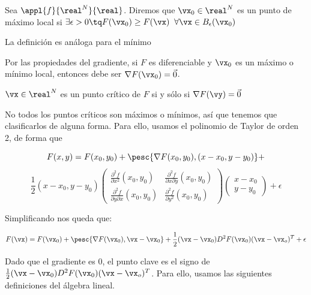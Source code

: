 \documentclass[nochap]{apuntes}
\begin{document}
\begin{defn} Sea $\appl{f}{\real^N}{\real}$. Diremos que $\vx_0 \in \real^N$ es un punto de máximo local si $\exists \epsilon > 0 \tq F(\vx_0) \geq F(\vx)\;\; \forall \vx \in B_{\epsilon} (\vx_0) $

La definición es análoga para el mínimo\end{defn}

\begin{remark} Por las propiedades del gradiente, si $F$ es diferenciable y $\vx_0$ es un máximo o mínimo local, entonces debe ser $\nabla F(\vx_0) = \vec{0}$.\end{remark}

\begin{defn} $\vx \in \real^N$ es un punto crítico de $F$ si y sólo si $\nabla F(\vy) = \vec{0}$\end{defn}

No todos los puntos críticos son máximos o mínimos, así que tenemos que clasificarlos de alguna forma. Para ello, usamos el polinomio de Taylor de orden 2, de forma que 

\[
F(x,y) = F(x_0, y_0) + \pesc{\nabla F(x_0, y_0), (x-x_0, y-y_0)} +\]\[\frac{1}{2}(x-x_0, y-y_0)\left(\begin{matrix} \frac{\partial^2 f}{∂ x^2} (x_0,y_0) & \frac{\partial^2 f}{\partial x \partial y} (x_0,y_0) 
\\ \frac{\partial^2 f}{\partial y \partial x} (x_0,y_0) & \frac{\partial^2 f}{\partial y^2} (x_0,y_0) \end{matrix}\right) \left(\begin{matrix} x - x_0 \\ y - y_0 \end{matrix}\right) + \epsilon \]

Simplificando nos queda que:

\[F(\vx) = F(\vx_0) + \pesc{\nabla F(\vx_0), \vx - \vx_0} + \frac{1}{2}(\vx - \vx_0) D^2F(\vx_0) (\vx - \vx_o) ^T + \epsilon\]

Dado que el gradiente es 0, el punto clave es el signo de $\frac{1}{2}(\vx - \vx_0) D^2F(\vx_0) (\vx - \vx_o) ^T$. Para ello, usamos las siguientes definiciones del álgebra lineal.
\end{document}
